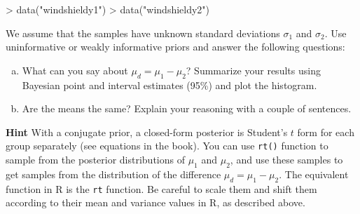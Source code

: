 \documentclass[a4paper,11pt]{article}
\begin{document}
\begin{Schunk}
\begin{Sinput}
> data("windshieldy1")
> data("windshieldy2")
\end{Sinput}
\end{Schunk}

We assume that the samples have unknown standard deviations $\sigma_1$
and $\sigma_2$. Use uninformative or weakly informative priors and
answer the following questions:
\begin{enumerate}[a)]
\item What can you say about $\mu_d = \mu_1 - \mu_2$? Summarize
  your results using Bayesian point and interval estimates (95\%) and plot the histogram.
\item Are the means the same? Explain your reasoning with a couple of sentences.
\end{enumerate}
\textbf{Hint} With a conjugate prior, a closed-form posterior is Student's $t$ form for each group separately (see equations in the book). You can use {\tt rt()} function to sample from the posterior distributions of $\mu_1$ and $\mu_2$, and use these samples to get samples from the distribution of the difference $\mu_d = \mu_1 - \mu_2$. The equivalent function in R is the {\tt rt} function. Be careful to scale them and shift them according to their mean and variance values in R, as described above.
\end{document}

